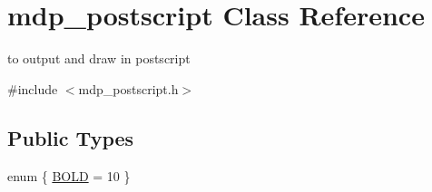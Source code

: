 \hypertarget{classmdp__postscript}{
\section{mdp\_\-postscript Class Reference}
\label{classmdp__postscript}
}


to output and draw in postscript  


{\ttfamily \#include $<$mdp\_\-postscript.h$>$}\subsection*{Public Types}
\begin{DoxyCompactItemize}
\item 
enum \{ \hyperlink{classmdp__postscript_a9a7e58c0e001105f4fe6d86a0a11348fa8266db73d3c5c06b4c4e8fdb9c4c38c0}{BOLD} = 10
 \}
\end{DoxyCompactItemize}
